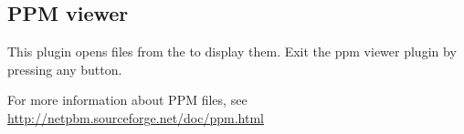 \subsection{PPM viewer}
This plugin opens  files from the 
to display them. Exit the ppm viewer plugin by pressing any button.


For more information about PPM files, see
\url{http://netpbm.sourceforge.net/doc/ppm.html}
